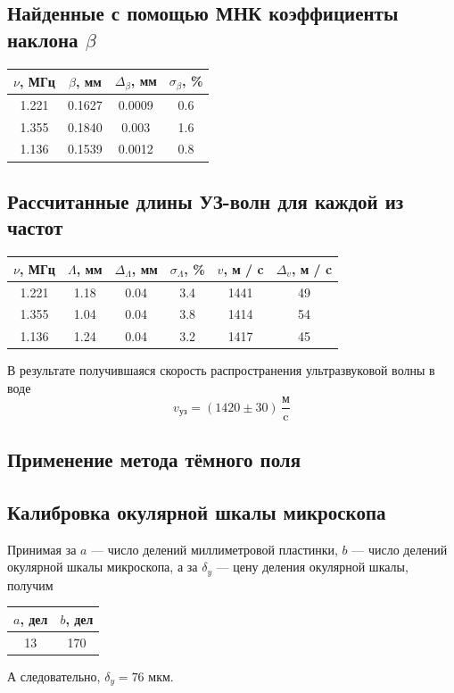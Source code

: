 \documentclass[12pt]{article}
\begin{document}
\subsection*{Найденные с помощью МНК коэффициенты наклона $\beta$}
\begin{table}[h!]
	\centering
	\begin{tabular}{|c|c|c|c|}
	\hline
		$\nu$, МГц & $\beta$, мм & $\Delta_\beta$, мм & $\sigma_\beta$, \% \\
	\hline
		1.221 & 0.1627 & 0.0009 & 0.6 \\
	\hline
		1.355 & 0.1840 & 0.003 & 1.6 \\
	\hline
		1.136 & 0.1539 & 0.0012 & 0.8 \\
	\hline
	\end{tabular}
\end{table}
\subsection*{Рассчитанные длины УЗ-волн для каждой из частот}
\begin{table}[h!]
	\centering
	\begin{tabular}{|c|c|c|c|c|c|}
	\hline
		$\nu$, МГц & $\Lambda$, мм & $\Delta_\Lambda$, мм & $\sigma_\Lambda$, \% & $v$, м / c & $\Delta_v$, м / c \\
	\hline
		1.221 & 1.18 & 0.04 & 3.4 & 1441 & 49 \\  
	\hline
		1.355 & 1.04 & 0.04 & 3.8 & 1414 & 54 \\ 
	\hline
		1.136 & 1.24 & 0.04 & 3.2 & 1417 & 45 \\
	\hline
	\end{tabular}
\end{table}
\par
	В результате получившаяся скорость распространения ультразвуковой волны в воде
\[
	v_\text{уз} = \left(1420 \pm 30 \right) \, \frac{\text{м}}{\text{c}}
\]
\newpage
\subsection*{Применение метода тёмного поля}
\subsection*{Калибровка окулярной шкалы микроскопа}
\par
	Принимая за $a$ --- число делений миллиметровой пластинки, $b$ --- число делений окулярной шкалы микроскопа, а за $\delta_y$ --- цену деления окулярной шкалы, получим
\begin{table}[h!]
	\centering
	\begin{tabular}{|c|c|}
	\hline
		$a$, дел & $b$, дел \\
	\hline
		13 & 170 \\
	\hline
	\end{tabular}
\end{table}
\par
	А следовательно, $\delta_y = 76$ мкм.
\end{document}
